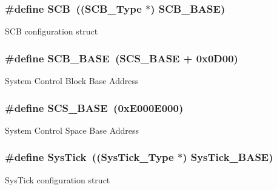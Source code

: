 \subsubsection[{\texorpdfstring{S\+CB}{SCB}}]{\setlength{\rightskip}{0pt plus 5cm}\#define S\+CB~(({\bf S\+C\+B\+\_\+\+Type} $\ast$)           {\bf S\+C\+B\+\_\+\+B\+A\+SE})}\hypertarget{group__CMSIS__CM3__core__register_gaaaf6477c2bde2f00f99e3c2fd1060b01}{}\label{group__CMSIS__CM3__core__register_gaaaf6477c2bde2f00f99e3c2fd1060b01}
S\+CB configuration struct 
\subsubsection[{\texorpdfstring{S\+C\+B\+\_\+\+B\+A\+SE}{SCB_BASE}}]{\setlength{\rightskip}{0pt plus 5cm}\#define S\+C\+B\+\_\+\+B\+A\+SE~({\bf S\+C\+S\+\_\+\+B\+A\+SE} +  0x0\+D00)}\hypertarget{group__CMSIS__CM3__core__register_gad55a7ddb8d4b2398b0c1cfec76c0d9fd}{}\label{group__CMSIS__CM3__core__register_gad55a7ddb8d4b2398b0c1cfec76c0d9fd}
System Control Block Base Address 
\subsubsection[{\texorpdfstring{S\+C\+S\+\_\+\+B\+A\+SE}{SCS_BASE}}]{\setlength{\rightskip}{0pt plus 5cm}\#define S\+C\+S\+\_\+\+B\+A\+SE~(0x\+E000\+E000)}\hypertarget{group__CMSIS__CM3__core__register_ga3c14ed93192c8d9143322bbf77ebf770}{}\label{group__CMSIS__CM3__core__register_ga3c14ed93192c8d9143322bbf77ebf770}
System Control Space Base Address 
\subsubsection[{\texorpdfstring{Sys\+Tick}{SysTick}}]{\setlength{\rightskip}{0pt plus 5cm}\#define Sys\+Tick~(({\bf Sys\+Tick\+\_\+\+Type} $\ast$)       {\bf Sys\+Tick\+\_\+\+B\+A\+SE})}\hypertarget{group__CMSIS__CM3__core__register_gacd96c53beeaff8f603fcda425eb295de}{}\label{group__CMSIS__CM3__core__register_gacd96c53beeaff8f603fcda425eb295de}
Sys\+Tick configuration struct 
